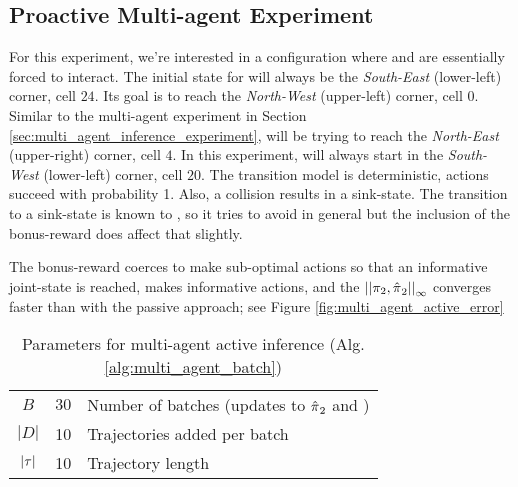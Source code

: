 \subsection{Proactive Multi-agent Experiment}

	For this experiment, we're interested in a configuration where  and  are essentially forced to interact. The initial state for  will always be the \emph{South-East} (lower-left) corner, cell $24$. Its goal is to reach the \emph{North-West} (upper-left) corner, cell $0$. Similar to the multi-agent experiment in Section \ref{sec:multi_agent_inference_experiment},  will be trying to reach the \emph{North-East} (upper-right) corner, cell $4$. In this experiment,  will always start in the \emph{South-West} (lower-left) corner, cell $20$. The transition model is deterministic, actions succeed with probability 1. Also, a collision results in a sink-state. The transition to a sink-state is known to , so it tries to avoid  in general but the inclusion of the bonus-reward does affect that slightly.
	
	The bonus-reward coerces  to make sub-optimal actions so that an informative joint-state is reached,  makes informative actions, and the $\left|\left|\pi_{2},\hat{\pi_{}}_2\right|\right|_{\infty}$ converges faster than with the passive approach; see Figure \ref{fig:multi_agent_active_error}

    \begin{table}[htb]
	\centering
	\begin{tabular}{c|l l}
		$B$ & $30$ & Number of batches (updates to $\hat{\pi_{}}_2$ and \policy{1})\\
		$|D|$ & 10 & Trajectories added per batch \\
		$|\tau|$ & 10 & Trajectory length \\
	\end{tabular}
	\caption{Parameters for multi-agent active inference (Alg. \ref{alg:multi_agent_batch})}
	\label{table:multi_agent_active_alg_params}
\end{table}


